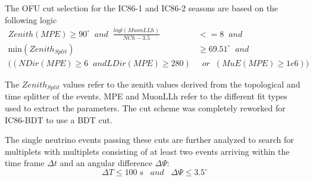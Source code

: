 The OFU cut selection for the IC86-1 and IC86-2 seasons are based on the 
following logic
\begin{equation}
\begin{align}
Zenith (MPE) \geq 90^\circ \; \; and \; \; \frac{logl (MuonLLh)}{NCh - 3.5} & 
<= 8 \; \; and \\ \text{min} (Zenith_{Split}) &\geq 69.51^\circ \; 
\; and \\
((NDir (MPE) \geq 6 \; \;
and LDir (MPE) \geq 280 )& \; \;or \; \;(MuE (MPE) \geq 1e6))
\end{align}
\end{equation}

The $Zenith_{Split}$ values refer to the 
zenith values derived from the topological and time splitter of the events. MPE 
and MuonLLh refer to the different fit types used to extract the parameters. 
The cut scheme was completely reworked  for IC86-BDT to use a BDT cut.

The single neutrino events passing these cuts are further analyzed to search 
for multiplets with multiplets consisting of at least two events arriving 
within the time frame $\Delta t$ and an angular difference $\Delta \Psi$:
\begin{equation}
 \Delta T \leq 100 \text{ s} \;\;\; and \;\;\; \Delta \Psi \leq 3.5^\circ
\end{equation}


